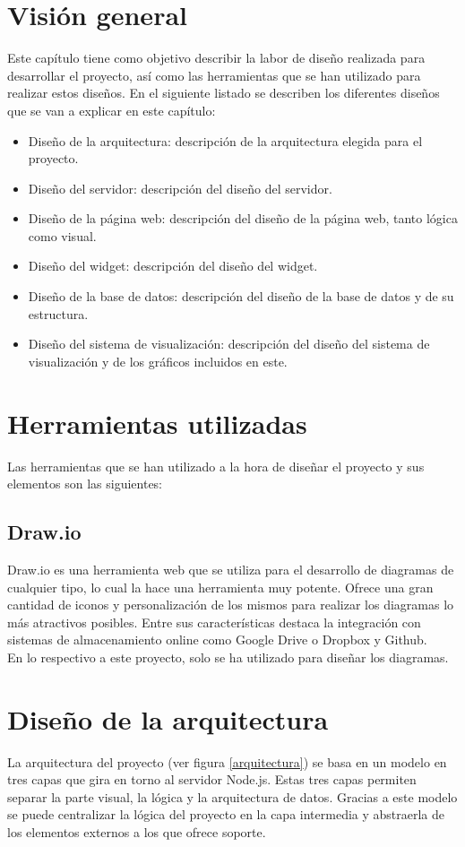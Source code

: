 \section{Visión general}
Este capítulo tiene como objetivo describir la labor de diseño realizada para desarrollar el proyecto, así como las herramientas que se han utilizado para realizar estos diseños. En el siguiente listado se describen los diferentes diseños que se van a explicar en este capítulo:

\begin{itemize}
	\item Diseño de la arquitectura: descripción de la arquitectura elegida para el proyecto.
	\item Diseño del servidor: descripción del diseño del servidor.
	\item Diseño de la página web: descripción del diseño de la página web, tanto lógica como visual.
	\item Diseño del widget: descripción del diseño del widget.
	\item Diseño de la base de datos: descripción del diseño de la base de datos y de su estructura.
	\item Diseño del sistema de visualización: descripción del diseño del sistema de visualización y de los gráficos incluidos en este.
\end{itemize}

\section{Herramientas utilizadas}
Las herramientas que se han utilizado a la hora de diseñar el proyecto y sus elementos son las siguientes:

\subsection{Draw.io}
Draw.io\cite{draw.io} es una herramienta web que se utiliza para el desarrollo de diagramas de cualquier tipo, lo cual la hace una herramienta muy potente. Ofrece una gran cantidad de iconos y personalización de los mismos para realizar los diagramas lo más atractivos posibles. Entre sus características destaca la integración con sistemas de almacenamiento online como Google Drive o Dropbox y Github.\\

En lo respectivo a este proyecto, solo se ha utilizado para diseñar los diagramas.

\section{Diseño de la arquitectura}
La arquitectura del proyecto (ver figura \ref{arquitectura}) se basa en un modelo en tres capas que gira en torno al servidor Node.js. Estas tres capas permiten separar la parte visual, la lógica y la arquitectura de datos. Gracias a este modelo se puede centralizar la lógica del proyecto en la capa intermedia y abstraerla de los elementos externos a los que ofrece soporte.\\

